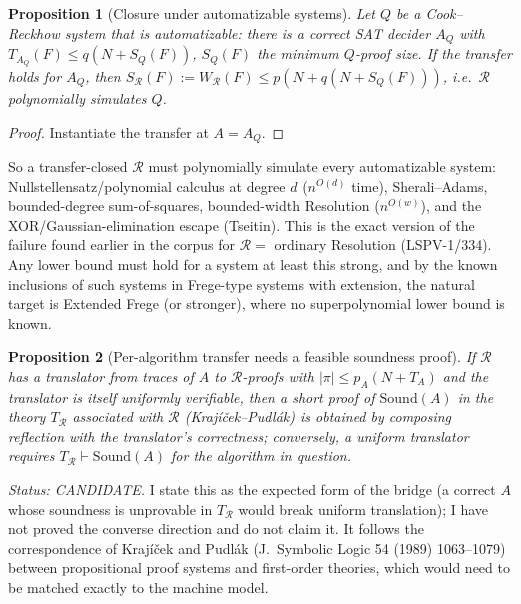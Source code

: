 \documentclass[11pt]{article}
\newtheorem{proposition}{Proposition}
\begin{document}
\begin{proposition}[Closure under automatizable systems]
Let $Q$ be a Cook--Reckhow system that is automatizable: there is a correct SAT decider $A_Q$ with $T_{A_Q}(F)\le q(N+S_Q(F))$, $S_Q(F)$ the minimum $Q$-proof size. If the transfer holds for $A_Q$, then $S_{\mathcal R}(F):=W_{\mathcal R}(F)\le p(N+q(N+S_Q(F)))$, i.e.\ $\mathcal R$ polynomially simulates $Q$.
\end{proposition}
\begin{proof} Instantiate the transfer at $A=A_Q$. \end{proof}
So a transfer-closed $\mathcal R$ must polynomially simulate every automatizable system: Nullstellensatz/polynomial calculus at degree $d$ ($n^{O(d)}$ time), Sherali--Adams, bounded-degree sum-of-squares, bounded-width Resolution ($n^{O(w)}$), and the XOR/Gaussian-elimination escape (Tseitin). This is the exact version of the failure found earlier in the corpus for $\mathcal R=$ ordinary Resolution (LSPV-1/334). Any lower bound must hold for a system at least this strong, and by the known inclusions of such systems in Frege-type systems with extension, the natural target is Extended Frege (or stronger), where no superpolynomial lower bound is known.

\begin{proposition}[Per-algorithm transfer needs a feasible soundness proof]
If $\mathcal R$ has a translator from traces of $A$ to $\mathcal R$-proofs with $|\pi|\le p_A(N+T_A)$ \emph{and} the translator is itself uniformly verifiable, then a short proof of $\mathrm{Sound}(A)$ in the theory $T_{\mathcal R}$ associated with $\mathcal R$ (Krajíček--Pudlák) is obtained by composing reflection with the translator's correctness; conversely, a uniform translator requires $T_{\mathcal R}\vdash \mathrm{Sound}(A)$ for the algorithm in question.
\end{proposition}
\emph{Status: CANDIDATE.} I state this as the expected form of the bridge (a correct $A$ whose soundness is unprovable in $T_{\mathcal R}$ would break uniform translation); I have not proved the converse direction and do not claim it. It follows the correspondence of Krajíček and Pudlák (J.\ Symbolic Logic 54 (1989) 1063--1079) between propositional proof systems and first-order theories, which would need to be matched exactly to the machine model.
\end{document}
